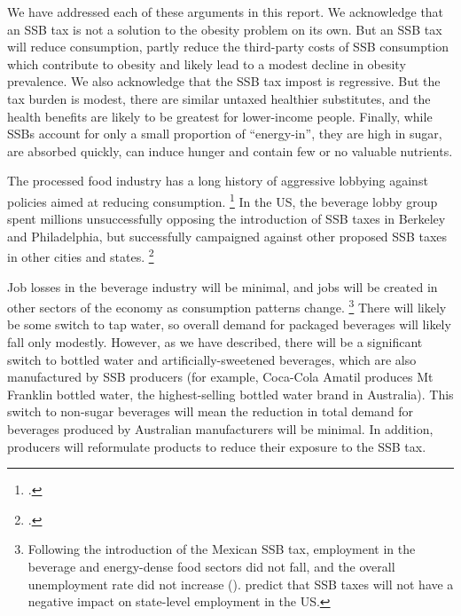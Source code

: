 \documentclass[embargoed]{grattan}
\begin{document}
We have addressed each of these arguments in this report. We acknowledge that an SSB tax is not a solution to the obesity problem on its own.
But an SSB tax will reduce consumption, partly reduce the third-party costs of SSB consumption which contribute to obesity and likely lead to a modest decline in obesity prevalence.
We also acknowledge that the SSB tax impost is regressive.
But the tax burden is modest, there are similar untaxed healthier substitutes, and the health benefits are likely to be greatest for lower-income people.
Finally, while SSBs account for only a small proportion of “energy-in”, they are high in sugar, are absorbed quickly, can induce hunger and contain few or no valuable nutrients.

The processed food industry has a long history of aggressive lobbying against policies aimed at reducing consumption.%
\footcites{Nestle2015Sodapoliticstaking}{Observatory2016spoonfulsugarHow}{Koplan2010Responsefoodbeverage} In the US, the beverage lobby group spent millions unsuccessfully opposing the introduction of SSB taxes in Berkeley and Philadelphia, but successfully campaigned against other proposed SSB taxes in other cities and states.%
\footcites{Nestle2015Sodapoliticstaking}{Nadolny2016Sodataxpasses}{Organization2016FiscalPoliciesDiet}{Steinmetz2014BigSodaFights}{Nadolny2016Sodataxpasses}{Belluz2016UStaxes}


Job losses in the beverage industry will be minimal, and jobs will be created in other sectors of the economy as consumption patterns change.%
\footnote{Following the introduction of the Mexican SSB tax, employment in the beverage and energy-dense food sectors did not fall, and the overall unemployment rate did not increase (\textcite{SaludPublica2016Employmentchangesassociated}). \textcite{Powell2014Employment} predict that SSB taxes will not have a negative impact on state-level employment in the US.} There will likely be some switch to tap water, so overall demand for packaged beverages will likely fall only modestly.
However, as we have described, there will be a significant switch to bottled water and artificially-sweetened beverages, which are also manufactured by SSB producers (for example, Coca-Cola Amatil produces Mt Franklin bottled water, the highest-selling bottled water brand in Australia).
This switch to non-sugar beverages will mean the reduction in total demand for beverages produced by Australian manufacturers will be minimal.
In addition, producers will reformulate products to reduce their exposure to the SSB tax.
\end{document}
